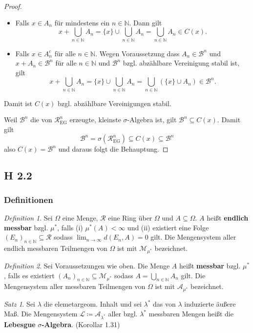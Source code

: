 \documentclass[draft,a5paper]{article}
\theoremstyle{remark}
\newtheorem*{Satz}{Satz}
\newtheorem*{Definition}{Definition}
\begin{document}
\begin{proof}
\begin{itemize}
    \begin{itemize}
    \item Falls \(x \in A_{n}\) für mindestens ein
      \(n \in \mathbb{N}\).  Dann gilt
      \[x + \bigcup_{n \in \mathbb{N}}{A_{n}} = \{x\} \cup \bigcup_{n \in \mathbb{N}}{A_{n}} = \bigcup_{n \in
          \mathbb{N}}{A_{n}} \in C(x).\]
    \item Falls \(x \in A^{c}_{n}\) für alle \(n \in \mathbb{N}\).  Wegen Voraussetzung
      dass \(A_{n} \in \mathcal{B}^{n}\) und \(x + A_{n} \in \mathcal{B}^{n}\) für alle \(n \in \mathbb{N}\)
      und \(\mathcal{B}^{n}\) bzgl. abzählbare Vereinigung stabil ist, gilt
      \[x + \bigcup_{n\in \mathbb{N}}{A_{n}} = \{x\} \cup \bigcup_{n\in \mathbb{N}}{A_{n}} = \bigcup_{n \in
          \mathbb{N}}{\left(\{x\} \cup A_{n}\right)} \in \mathcal{B}^{n}.\]
    \end{itemize}
    Damit ist \(C(x)\) bzgl. abzählbare Vereinigungen stabil.
  \end{itemize}
  Weil \(\mathcal{B}^{n}\) die von \(\mathcal{R}_{\text{EG}}^{n}\) erzeugte, kleinste
  \(\sigma\)-Algebra ist, gilt \(\mathcal{B}^{n} \subseteq C(x)\).  Damit gilt
  \[\mathcal{B}^{n} = \sigma(\mathcal{R}_{\text{EG}}^{n}) \subseteq C(x) \subseteq \mathcal{B}^{n}\]
  also \(C(x) = \mathcal{B}^{n}\) und daraus folgt die Behauptung.
\end{proof}
\subsection{H 2.2}
\subsubsection{Definitionen}
\begin{Definition}
  Sei \(\Omega\) eine Menge, \(\mathcal{R}\) eine Ring über \(\Omega\) und
  \(A \subseteq \Omega\).  \(A\) heißt \textbf{endlich messbar} bzgl.
  \(\mu^{*}\), falls (i) \(\mu^{*}(A) < \infty\) und (ii) existiert eine Folge
  \((E_{n})_{n \in \mathbb{N}} \subseteq \mathcal{R}\) sodass
  \(\lim_{n \to \infty}{d(E_{n}, A)}=0\) gilt.  Die Mengensystem aller endlich
  messbaren Teilmengen von \(\Omega\) ist mit \(\mathcal{M}_{\mu^{*}}\) bezeichnet.
\end{Definition}
\begin{Definition}
  Sei Voraussetzungen wie oben.  Die Menge \(A\) heißt \textbf{messbar}
  bzgl. \(\mu^{*}\), falls es existiert \((A_{n})_{n \in \mathbb{N}} \subseteq \mathcal{M}_{\mu^{*}}\)
  sodass \(A = \bigcup_{n \in \mathbb{N}}{A_{n}}\) gilt.  Die Mengensystem aller
  messbaren Teilmengen von \(\Omega\) ist mit \(\mathcal{A}_{\mu^{*}}\) bezeichnet.
\end{Definition}
\begin{Satz}
  Sei \(\lambda\) die elemetargeom. Inhalt und sei \(\lambda^{*}\) das von
  \(\lambda\) induzierte äußere Maß.  Die Mengensystem
  \(\mathcal{L} \coloneq \mathcal{A}_{\lambda^{*}}\) aller bzgl.
  \(\lambda^{*}\) messbaren Mengen heißt die \textbf{Lebesgue}
  \(\sigma\)\textbf{-Algebra}. (Korollar 1.31)
\end{Satz}
\end{document}
